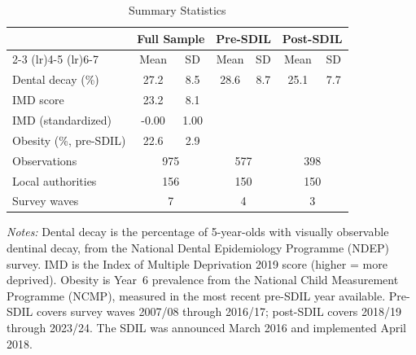 \begin{table}[H]
\centering
\caption{Summary Statistics}
\label{tab:summary}
\begin{threeparttable}
\begin{tabular}{lcccccc}
\toprule
 & \multicolumn{2}{c}{Full Sample} & \multicolumn{2}{c}{Pre-SDIL} & \multicolumn{2}{c}{Post-SDIL} \\
\cmidrule(lr){2-3} \cmidrule(lr){4-5} \cmidrule(lr){6-7}
 & Mean & SD & Mean & SD & Mean & SD \\
\midrule
Dental decay (\%) & 27.2 & 8.5 & 28.6 & 8.7 & 25.1 & 7.7 \\
IMD score & 23.2 & 8.1 & & & & \\
IMD (standardized) & -0.00 & 1.00 & & & & \\
Obesity (\%, pre-SDIL) & 22.6 & 2.9 & & & & \\
\midrule
Observations & \multicolumn{2}{c}{975} & \multicolumn{2}{c}{577} & \multicolumn{2}{c}{398} \\
Local authorities & \multicolumn{2}{c}{156} & \multicolumn{2}{c}{150} & \multicolumn{2}{c}{150} \\
Survey waves & \multicolumn{2}{c}{7} & \multicolumn{2}{c}{4} & \multicolumn{2}{c}{3} \\
\bottomrule
\end{tabular}
\begin{tablenotes}[flushleft]
\small
\item \textit{Notes:} Dental decay is the percentage of 5-year-olds with visually observable dentinal decay, from the National Dental Epidemiology Programme (NDEP) survey. IMD is the Index of Multiple Deprivation 2019 score (higher = more deprived). Obesity is Year~6 prevalence from the National Child Measurement Programme (NCMP), measured in the most recent pre-SDIL year available. Pre-SDIL covers survey waves 2007/08 through 2016/17; post-SDIL covers 2018/19 through 2023/24. The SDIL was announced March 2016 and implemented April 2018.
\end{tablenotes}
\end{threeparttable}
\end{table}

